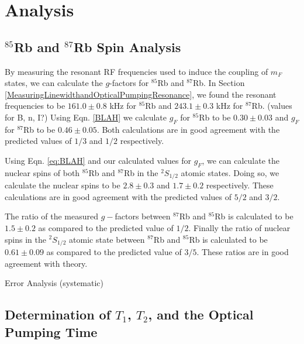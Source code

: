 
\section{Analysis}\label{analysis}

\subsection{$^{85}$Rb and $^{87}$Rb Spin Analysis}\label{SpinAnalysis}

By measuring the resonant RF frequencies used to induce the coupling of $m_F$ states, we can calculate the $g$-factors for $^{85}$Rb and $^{87}$Rb.  In Section \ref{MeasuringLinewidthandOpticalPumpingResonance}, we found the resonant frequencies to be $161.0 \pm 0.8$ kHz for $^{85}$Rb and $243.1\pm 0.3$ kHz for $^{87}$Rb.  (values for B, n, I?) Using Eqn. \ref{BLAH} we calculate $g_F$ for $^{85}$Rb to be $0.30\pm 0.03$ and $g_F$ for $^{87}$Rb to be $0.46\pm 0.05$.  Both calculations are in good agreement with the predicted values of $1/3$ and $1/2$ respectively. 

Using Eqn. \ref{eq:BLAH} and our calculated values for $g_F$, we can calculate the nuclear spins of both $^{85}$Rb and $^{87}$Rb in the $^{2}S_{1/2}$ atomic states.  Doing so, we calculate the nuclear spins to be $2.8 \pm 0.3$ and $1.7 \pm 0.2$ respectively.  These calculations are in good agreement with the predicted values of $5/2$ and $3/2$.  

The ratio of the measured $g-$factors between $^{87}$Rb and $^{85}$Rb is calculated to be $1.5 \pm 0.2$ as compared to the predicted value of $1/2$.  Finally the ratio of nuclear spins in the $^{2}S_{1/2}$ atomic state between $^{87}$Rb and $^{85}$Rb is calculated to be $0.61\pm 0.09$ as compared to the predicted value of $3/5$.  These ratios are in good agreement with theory.

Error Analysis (systematic)

\subsection{Determination of $T_{1}$, $T_{2}$, and the Optical Pumping Time}\label{DeterminationofTimes}


